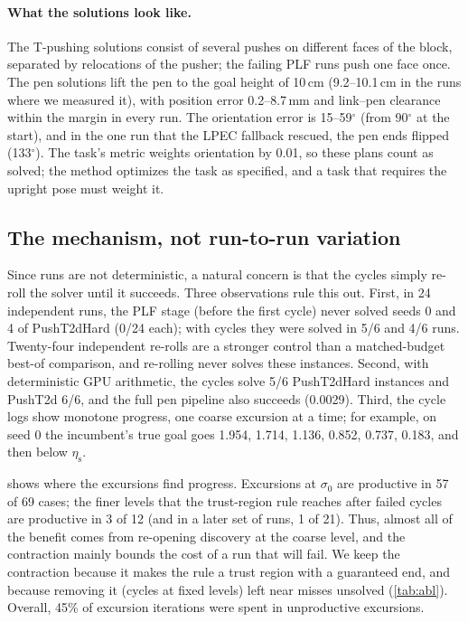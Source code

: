 \documentclass[11pt]{article}
\theoremstyle{remark}
\newcommand{\etas}{\eta_{\mathrm{s}}}
\begin{document}
\paragraph{What the solutions look like.} The T-pushing solutions consist of several pushes on different faces of the block, separated by relocations of the pusher; the failing PLF runs push one face once. The pen solutions lift the pen to the goal height of 10\,cm (9.2--10.1\,cm in the runs where we measured it), with position error 0.2--8.7\,mm and link--pen clearance within the margin in every run. The orientation error is 15--59$^\circ$ (from 90$^\circ$ at the start), and in the one run that the LPEC fallback rescued, the pen ends flipped (133$^\circ$). The task's metric weights orientation by 0.01, so these plans count as solved; the method optimizes the task as specified, and a task that requires the upright pose must weight it.

\subsection{The mechanism, not run-to-run variation}
\label{sec:mech}

Since runs are not deterministic, a natural concern is that the cycles simply re-roll the solver until it succeeds. Three observations rule this out. First, in 24 independent runs, the PLF stage (before the first cycle) never solved seeds 0 and 4 of PushT2dHard (0/24 each); with cycles they were solved in 5/6 and 4/6 runs. Twenty-four independent re-rolls are a stronger control than a matched-budget best-of comparison, and re-rolling never solves these instances. Second, with deterministic GPU arithmetic, the cycles solve 5/6 PushT2dHard instances and PushT2d 6/6, and the full pen pipeline also succeeds (0.0029). Third, the cycle logs show monotone progress, one coarse excursion at a time; for example, on seed 0 the incumbent's true goal goes 1.954, 1.714, 1.136, 0.852, 0.737, 0.183, and then below $\etas$.

 shows where the excursions find progress. Excursions at $\sigma_0$ are productive in 57 of 69 cases; the finer levels that the trust-region rule reaches after failed cycles are productive in 3 of 12 (and in a later set of runs, 1 of 21). Thus, almost all of the benefit comes from re-opening discovery at the coarse level, and the contraction mainly bounds the cost of a run that will fail. We keep the contraction because it makes the rule a trust region with a guaranteed end, and because removing it (cycles at fixed levels) left near misses unsolved (\cref{tab:abl}). Overall, 45\% of excursion iterations were spent in unproductive excursions.
\end{document}
